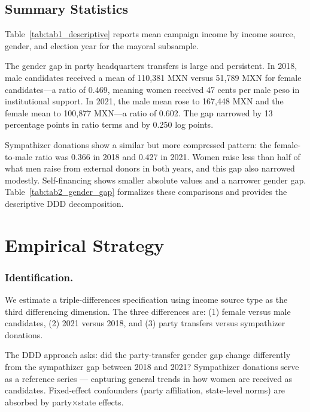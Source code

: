 \documentclass[12pt]{article}
\begin{document}
\subsection{Summary Statistics}

Table~\ref{tab:tab1_descriptive} reports mean campaign income by income source, gender, and election year for the mayoral subsample.



The gender gap in party headquarters transfers is large and persistent. In 2018, male candidates received a mean of 110,381 MXN versus 51,789 MXN for female candidates---a ratio of 0.469, meaning women received 47 cents per male peso in institutional support. In 2021, the male mean rose to 167,448 MXN and the female mean to 100,877 MXN---a ratio of 0.602. The gap narrowed by 13 percentage points in ratio terms and by 0.250 log points.

Sympathizer donations show a similar but more compressed pattern: the female-to-male ratio was 0.366 in 2018 and 0.427 in 2021. Women raise less than half of what men raise from external donors in both years, and this gap also narrowed modestly. Self-financing shows smaller absolute values and a narrower gender gap. Table~\ref{tab:tab2_gender_gap} formalizes these comparisons and provides the descriptive DDD decomposition.

\section{Empirical Strategy}
\label{sec:strategy}

\subsubsection*{Identification.}
We estimate a triple-differences specification using income source type as the third differencing dimension. The three differences are: (1) female versus male candidates, (2) 2021 versus 2018, and (3) party transfers versus sympathizer donations.

The DDD approach asks: did the party-transfer gender gap change differently from the sympathizer gap between 2018 and 2021? Sympathizer donations serve as a reference series --- capturing general trends in how women are received as candidates. Fixed-effect confounders (party affiliation, state-level norms) are absorbed by party$\times$state effects.
\end{document}
